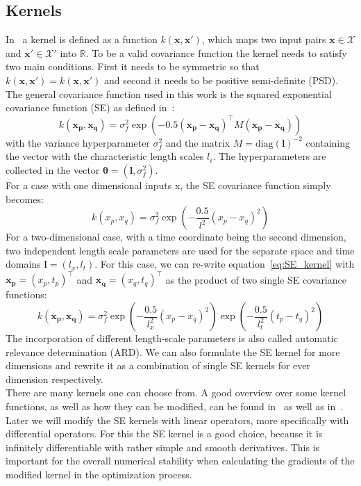\documentclass{article}
\begin{document}
\subsection{Kernels} \label{subsec: Kernels}
In~\cite{RasmussenCarlEdward} a kernel is defined as a function
$k(\bm{x},\bm{x'})$, which maps two input pairs $\bm{x} \in \mathcal{X}$ and
$\bm{x'} \in \mathcal{X'}$ into $\mathbb{R}$. To be a valid covariance function
the kernel needs to satisfy two main conditions. First it needs to be symmetric
so that $k(\bm{x,x'}) = k(\bm{x,x'})$ and second it needs to be positive
semi-definite (PSD). The general covariance function used in this work is the
squared exponential covariance function (SE) as defined
in~\cite{RasmussenCarlEdward}:
\begin{equation}
    \label{eq:SE_kernel}
    k(\bm{x_p}, \bm{x_q}) = \sigma_f^2  \exp({-0.5{(\bm{x_p}-\bm{x_q} )}^\intercal M (\bm{x_p}- \bm{x_q})})
\end{equation}
with the variance hyperparameter $\sigma_f^2$ and the matrix $M = {\mathrm{diag}(\bm{l})}^{-2}$ containing the vector with the characteristic length scales $l_i$. The hyperparameters are collected in the vector $\bm{\theta} = (\bm{l},\sigma_f^2)$. \\
For a case with one dimensional inputs x, the SE covariance function simply becomes:
\begin{equation}
    k(x_p, x_q) = \sigma_f^2  \exp\left({-\frac{0.5}{l^2} {(x_p-x_q)}^2}\right)
\end{equation}
For a two-dimensional case, with a time coordinate being the second dimension, two independent length scale parameters are used for the separate space and time domains $\bm{l} = (l_x,l_t)$. For this case, we can re-write equation~\ref{eq:SE_kernel} with $\bm{x_p} = {(x_p, t_p)}^\intercal$ and  $\bm{x_q} = {(x_q, t_q)}^\intercal$ as the product of two single SE covariance functions:
\begin{equation}
    k(\bm{x_p}, \bm{x_q}) = \sigma_f^2  \exp\left({-\frac{0.5}{l_x^2} {(x_p-x_q)}^2}\right) \exp\left({-\frac{0.5}{l_t^2} {(t_p-t_q)}^2}\right)
\end{equation}
The incorporation of different length-scale parameters is also called automatic relevance determination (ARD). We can also formulate the SE kernel for more dimensions and rewrite it as a combination of single SE kernels for ever dimension respectively.\\
There are many kernels one can choose from. A good overview over some kernel functions, as well as how they can be modified, can be found in~\cite{Duvenaud} as well as in~\cite{görtler2019a}. Later we will modify the SE kernels with linear operators, more specifically with differential operators. For this the SE kernel is a good choice, because it is infinitely differentiable with rather simple and smooth derivatives. This is important for the overall numerical stability when calculating the gradients of the modified kernel in the optimization process.\\ 
\end{document}
